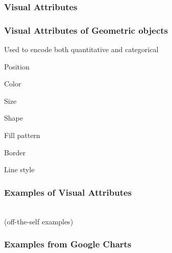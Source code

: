 \documentclass[12pt]{beamer}\usepackage[]{graphicx}\usepackage[]{color}
\begin{document}

\begin{frame}
\frametitle{Visual Attributes}
\begin{center}
\end{center}
\end{frame}


\begin{frame}
\frametitle{Visual Attributes of Geometric objects}

Used to encode both quantitative and categorical

\bbi
  \item Position
  \item Color
  \item Size
  \item Shape
  \item Fill pattern
  \item Border
  \item Line style
\ei

\end{frame}


\begin{frame}
\frametitle{Examples of Visual Attributes}
\begin{center}
\end{center}
\end{frame}


\begin{frame}
\begin{center}
{\Huge {}} \\
{\hilit (off-the-self examples)}
\end{center}
\end{frame}


\begin{frame}
\frametitle{Examples from Google Charts}
\begin{center}
\end{center}
\end{frame}
\end{document}
